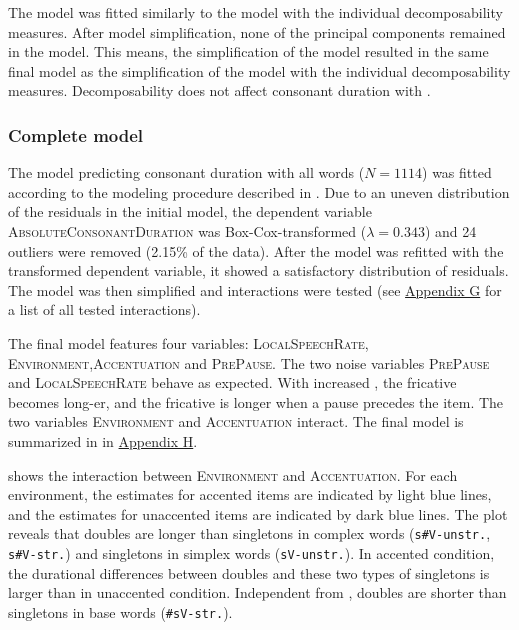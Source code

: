 The model was fitted similarly to the model with the individual decomposability measures. After model simplification, none of the principal components remained in the model. This means, the simplification of the model resulted in the same final model as the simplification of the model with the individual decomposability measures. Decomposability does not affect consonant duration with .


\subsubsection{Complete model}\largerpage

The model predicting consonant duration with all words ($N=1114$) was fitted according to the modeling procedure described in . Due to an uneven distribution of the residuals in the initial model, the dependent variable \textsc{AbsoluteConsonantDuration} was Box-Cox-transformed ($\lambda = 0.343$) and 24 outliers were removed (2.15\% of the data). After the model was refitted with the transformed dependent variable, it showed a satisfactory distribution of residuals.  The model was then simplified and interactions were tested (see \hyperref[Appendix G Summaries of tested interactions in experimental study]{Appendix G} for a list of all tested interactions). 

The final model features four variables: \textsc{LocalSpeechRate}, \textsc{Environment},\linebreak\textsc{Accentuation} and \textsc{PrePause}. The two noise variables \textsc{PrePause} and \textsc{LocalSpeechRate} behave as expected. With increased , the fricative becomes long-er, and the fricative is longer when a pause precedes the item.
 The two variables \textsc{Environment} and \textsc{Accentuation} interact. The final model is summarized in  in \hyperref[Appendix H: Model Summaries Experiment]{Appendix H}.




 shows the interaction between \textsc{Environment} and \textsc{Accentuation}. For each environment, the estimates for accented items are indicated by light blue lines, and the estimates for unaccented items are indicated by dark blue lines.
The plot reveals that doubles are longer than singletons in complex words (\texttt{s\#V-unstr.}, \texttt{s\#V-str.}) and singletons in simplex words (\texttt{sV-unstr.}). In accented condition, the durational differences between doubles and these two types of singletons is larger than in unaccented condition. 
Independent from , doubles are shorter than singletons in base words (\texttt{\#sV-str.}).


